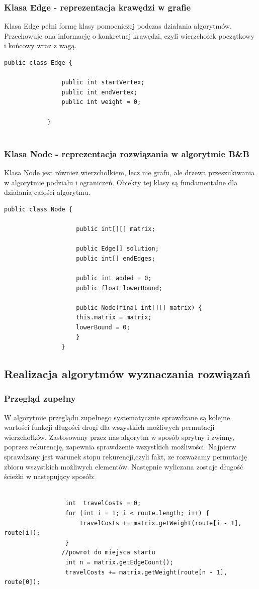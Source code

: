 \documentclass{article}
\begin{document}
		\subsubsection{Klasa Edge - reprezentacja krawędzi w grafie}
		
		Klasa Edge pełni formę klasy pomocniczej podczas działania algorytmów. Przechowuje ona informację o konkretnej krawędzi, czyli wierzchołek początkowy i końcowy wraz z wagą.
			\begin{lstlisting}[xleftmargin=-100pt]
			public class Edge {
			
				public int startVertex;
				public int endVertex;
				public int weight = 0;
						
			}
			
			\end{lstlisting}
		\subsubsection{Klasa Node - reprezentacja rozwiązania w algorytmie B\&B}
			Klasa Node jest również wierzchołkiem, lecz nie grafu, ale drzewa przeszukiwania w algorytmie podziału i ograniczeń. Obiekty tej klasy są fundamentalne dla działania całości algorytmu. 
				\begin{lstlisting}[xleftmargin=-150pt]
				public class Node {
					
					public int[][] matrix;
					
					public Edge[] solution;
					public int[] endEdges;
					
					public int added = 0;
					public float lowerBound;
					
					public Node(final int[][] matrix) {
					this.matrix = matrix;
					lowerBound = 0;
					}
				}
				\end{lstlisting}
	\subsection{Realizacja algorytmów wyznaczania rozwiązań}
		\subsubsection{Przegląd zupełny}
				W algorytmie przeglądu zupełnego systematycznie sprawdzane są kolejne wartości funkcji długości drogi dla wszystkich możliwych permutacji wierzchołków. Zastosowany przez nas algorytm w sposób sprytny i zwinny, poprzez rekurencję, zapewnia sprawdzenie wszystkich możliwości. Najpierw sprawdzany jest warunek stopu rekurencji,czyli fakt, ze rozważamy permutację zbioru wszystkich możliwych elementów. Następnie wyliczana zostaje długość ścieżki w następujący sposób:
				\begin{lstlisting}[xleftmargin=-150pt]
				
				 int  travelCosts = 0;
				 for (int i = 1; i < route.length; i++) {
					 travelCosts += matrix.getWeight(route[i - 1], route[i]);
				 }
				//powrot do miejsca startu
				 int n = matrix.getEdgeCount();
				 travelCosts += matrix.getWeight(route[n - 1], route[0]);
				\end{lstlisting}
\end{document}
